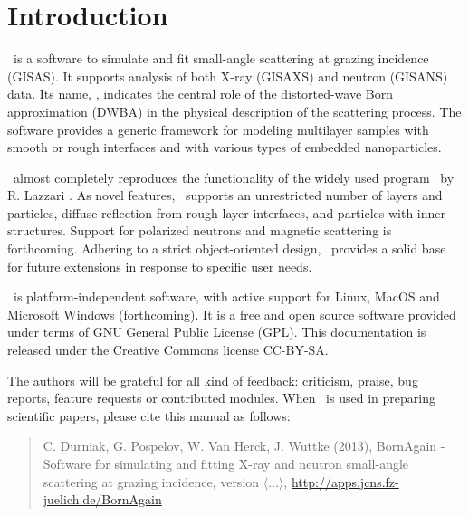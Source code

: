 \newpage
\chapter*{Introduction}


\BornAgain\ is a  software to simulate and fit small-angle
scattering at grazing incidence (GISAS). 
It supports analysis of both  X-ray (GISAXS) and neutron (GISANS) data.
Its name, \BornAgain, indicates the central role of the distorted-wave Born
approximation (DWBA) in the physical description of the
scattering process. The software provides a generic framework for modeling multilayer samples with smooth or
rough interfaces and with various types of embedded nano\-particles.

\BornAgain\ almost completely reproduces the functionality
of the widely used program \IsGISAXS\
by R. Lazzari \cite{Lazzari:vi0158}.
As novel features, \BornAgain\
supports an unrestricted number of layers and particles, 
diffuse reflection from rough layer interfaces,
and particles with inner structures.
Support for polarized neutrons and magnetic scattering is forthcoming.
Adhering to a strict object-oriented design,
\BornAgain\ provides a solid base for future extensions
in response to specific user needs.

\BornAgain\ is platform-independent software,
with active support for Linux, MacOS and 
Microsoft Windows (forthcoming). 
It is a free and open source software provided under terms
of GNU General Public License (GPL).
This documentation is released under the Creative Commons license CC-BY-SA.

The authors will be grateful for all kind of
feedback: criticism, praise, bug reports, feature requests
or contributed modules.
When \BornAgain\ is used in preparing scientific papers,
please cite this manual as follows: 
\begin{quote}
C. Durniak, G. Pospelov, W. Van Herck, J. Wuttke (2013),\newline
BornAgain - Software for simulating and fitting
X-ray and neutron small-angle scattering at grazing incidence,
version $\langle\ldots\rangle$,\newline
\url{http://apps.jcns.fz-juelich.de/BornAgain}
\end{quote}

